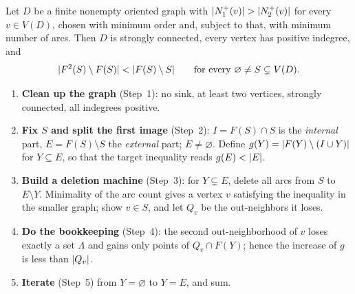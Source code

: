 \begin{lemma}\label{lem:deficit}
Let $D$ be a finite nonempty oriented graph with $\lvert N_1^+(v)\rvert>\lvert N_2^+(v)\rvert$ for every
$v\in V(D)$, chosen with minimum order and, subject to that, with minimum number of arcs. Then $D$
is strongly connected, every vertex has positive indegree, and
\begin{equation}\label{eq:deficit}
 \lvert F^2(S)\setminus F(S)\rvert<\lvert F(S)\setminus S\rvert
 \qquad\text{for every }\varnothing\ne S\subsetneq V(D).
\end{equation}
\end{lemma}



\begin{planbox}
\begin{enumerate}[leftmargin=1.3em,itemsep=1pt,topsep=1pt]
\item \textbf{Clean up the graph} (Step~1): no sink, at least two vertices, strongly
  connected, all indegrees positive.
\item \textbf{Fix $S$ and split the first image} (Step~2): $I=F(S)\cap S$ is the
  \emph{internal} part, $E=F(S)\setminus S$ the \emph{external} part; $E\ne\varnothing$. Define
  $g(Y)=\lvert F(Y)\setminus(I\cup Y)\rvert$ for $Y\subseteq E$, so that the target inequality reads
  $g(E)<\lvert E\rvert$.
\item \textbf{Build a deletion machine} (Step~3): for $Y\subsetneq E$, delete all arcs
  from $S$ to $E\setminus Y$. Minimality of the arc count gives a vertex $v$ satisfying the
  inequality in the smaller graph; show $v\in S$, and let $Q_v$ be the out-neighbors it loses.
\item \textbf{Do the bookkeeping} (Step~4): the second out-neighborhood of $v$ loses
  exactly a set $\Lambda$ and gains only points of $Q_v\cap F(Y)$; hence the increase of $g$ is
  less than $\lvert Q_v\rvert$.
\item \textbf{Iterate} (Step~5) from $Y=\varnothing$ to $Y=E$, and sum.
\end{enumerate}
\end{planbox}

